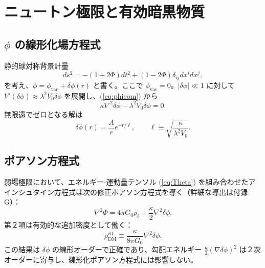 \documentclass[12pt,a4paper]{article}
\begin{document}
	\section{ニュートン極限と有効暗黒物質}
	
	\subsection{\(\phi\) の線形化場方程式}
	静的球対称背景計量
	\[
	ds^2 = -(1+2\Phi)dt^2 + (1-2\Phi)\delta_{ij}dx^i dx^j,
	\]
	を考え、\(\phi = \phi_{\mathrm{vac}} + \delta\phi(r)\) と書く。ここで \(\phi_{\mathrm{vac}} = 0\)。\(|\delta\phi| \ll 1\) に対して \(V'(\delta\phi) \approx \lambda^2 V_0 \delta\phi\) を展開し、(\ref{eq:phieom}) から
	\begin{equation}
		\kappa \nabla^2 \delta\phi - \lambda^2 V_0 \delta\phi = 0.
		\label{eq:lin-phi}
	\end{equation}
	無限遠でゼロとなる解は
	\begin{equation}
		\delta\phi(r) = \frac{A}{r} e^{-r/\ell}, \qquad \ell \equiv \sqrt{\frac{\kappa}{\lambda^2 V_0}}.
		\label{eq:deltaphi-sol}
	\end{equation}
	
	\subsection{ポアソン方程式}
	弱場極限において、エネルギー-運動量テンソル (\ref{eq:Theta}) を組み合わせたアインシュタイン方程式は次の修正ポアソン方程式を導く（詳細な導出は付録 G）：
	\begin{equation}
		\nabla^2 \Phi = 4\pi G_0 \rho_b + \frac{\kappa}{2} \nabla^2 \delta\phi.
		\label{eq:poisson}
	\end{equation}
	第２項は有効的な追加密度として働く：
	\begin{equation}
		\rho_{\mathrm{DM}}^{\mathrm{eff}} \equiv \frac{\kappa}{8\pi G_0} \nabla^2 \delta\phi.
		\label{eq:rhoDM}
	\end{equation}
	この結果は \(\delta\phi\) の線形オーダーで正確であり、勾配エネルギー \(\frac{\kappa}{2}(\nabla\delta\phi)^2\) は２次オーダーに寄与し、線形化ポアソン方程式には影響しない。
	
\end{document}
